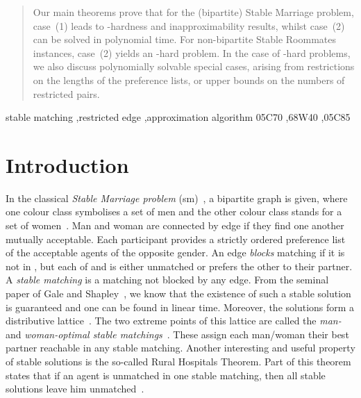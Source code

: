 \documentclass[preprint,12pt]{elsarticle}
\begin{document}
\begin{frontmatter}
\begin{abstract}
Our main theorems prove that for the (bipartite) Stable Marriage problem, case~(1) leads to -hardness and inapproximability results, whilst case~(2) can be solved in polynomial time.  For non-bipartite Stable Roommates instances, case~(2) yields an -hard problem.  In the case of -hard problems, we also discuss polynomially solvable special cases, arising from restrictions on the lengths of the preference lists, or upper bounds on the numbers of restricted pairs.
\end{abstract}

\begin{keyword}
stable matching \sep restricted edge \sep approximation algorithm 
 \MSC 05C70 \sep 68W40 \sep 05C85
\end{keyword}
\end{frontmatter}

\section{Introduction}
\label{se:intro}

In the classical \emph{Stable Marriage problem} ({\sc sm})~\cite{GS62}, a bipartite graph is given, where one colour class symbolises a set of men  and the other colour class stands for a set of women~. Man  and woman  are connected by edge  if they find one another mutually acceptable. Each participant provides a strictly ordered preference list of the acceptable agents of the opposite gender. An edge  \emph{blocks} matching  if it is not in , but each of  and  is either unmatched or prefers the other to their partner. A \emph{stable matching} is a matching not blocked by any edge. From the seminal paper of Gale and Shapley~\cite{GS62}, we know that the existence of such a stable solution is guaranteed and one can be found in linear time. Moreover, the solutions form a distributive lattice~\cite{Knu76}. The two extreme points of this lattice are called the \emph{man-} and \emph{woman-optimal stable matchings}~\cite{GS62}. These assign each man/woman their best partner reachable in any stable matching. Another interesting and useful property of stable solutions is the so-called Rural Hospitals Theorem. Part of this theorem states that if an agent is unmatched in one stable matching, then all stable solutions leave him unmatched~\cite{GS85}.
\end{document}
